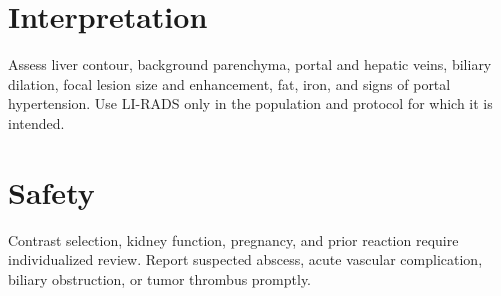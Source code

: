 \section{Interpretation}
Assess liver contour, background parenchyma, portal and hepatic veins, biliary dilation, focal lesion size and enhancement, fat, iron, and signs of portal hypertension. Use LI-RADS only in the population and protocol for which it is intended.

\section{Safety}
Contrast selection, kidney function, pregnancy, and prior reaction require individualized review. Report suspected abscess, acute vascular complication, biliary obstruction, or tumor thrombus promptly.

\clearpage
